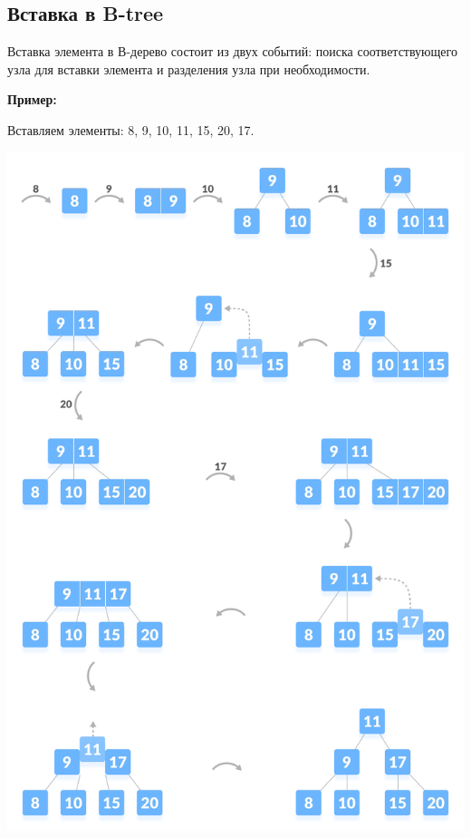         \subsection{Вставка в B-tree} 
        Вставка элемента в В-дерево состоит из двух событий: поиска соответствующего узла для вставки элемента и разделения узла при необходимости. \par
        
        \textbf{Пример:} \par
        Вставляем элементы: 8, 9, 10, 11, 15, 20, 17. \par
        \begin{center}
            \includegraphics[width=0.45\linewidth]{insertion.jpg} \par
        \end{center}
        \newpage
